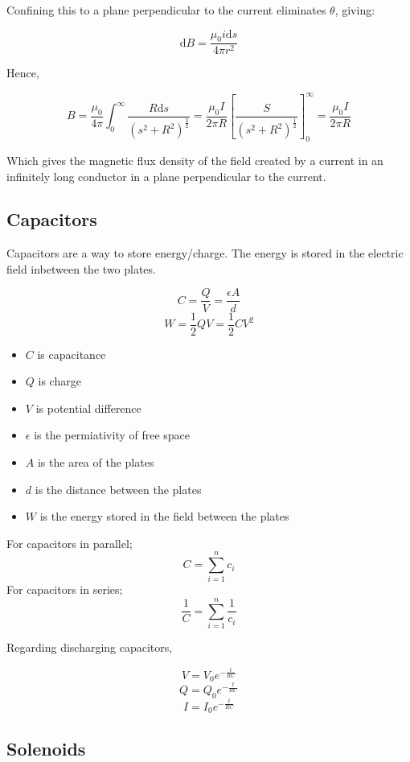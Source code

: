 \documentclass{article}
\begin{document}
\noindent Confining this to a plane perpendicular to the current eliminates $\theta$, giving:

\[\textrm{d}B = \frac{\mu_0 i \textrm{d}s}{4\pi r^2}\]

\noindent Hence,

\[B=\frac{\mu_0}{4\pi}\int_0^\infty\frac{R \textrm{d}s}{\left(s^2 + R^2\right)^{\frac{3}{2}}}=\frac{\mu_0 I}{2\pi R}\left[\frac{S}{\left(s^2 + R^2\right)^{\frac{1}{2}}}\right]_0^\infty=\frac{\mu_0 I}{2\pi R}\]

\noindent Which gives the magnetic flux density of the field created by a current in an infinitely long conductor in a plane perpendicular to the current.

\subsection{Capacitors}


Capacitors are a way to store energy/charge. The energy is stored in the electric field inbetween the two plates.

\[C=\frac{Q}{V}=\frac{\epsilon A}{d}\]
\[W=\frac{1}{2}QV=\frac{1}{2}CV^2\]

\begin{itemize}
	\item $C$ is capacitance
	\item $Q$ is charge
	\item $V$ is potential difference
	\item $\epsilon$ is the permiativity of free space
	\item $A$ is the area of the plates
	\item $d$ is the distance between the plates
	\item $W$ is the energy stored in the field between the plates
\end{itemize}

\noindent For capacitors in parallel;
\[C=\sum_{i=1}^nc_i\]
\noindent For capacitors in series;
\[\frac{1}{C}=\sum_{i=1}^n\frac{1}{c_i}\]

\noindent Regarding discharging capacitors,

\[V=V_0e^{-\frac{t}{RC}}\]
\[Q=Q_0e^{-\frac{t}{RC}}\]
\[I=I_0e^{-\frac{t}{RC}}\]

\subsection{Solenoids}
\end{document}
